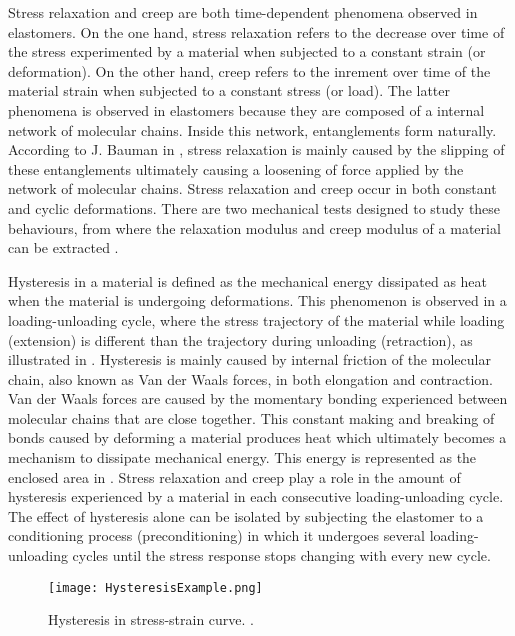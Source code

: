 Stress relaxation and creep are both time-dependent phenomena observed in elastomers. On the one hand, stress relaxation refers to the decrease over time of the stress experimented by a material when subjected to a constant strain (or deformation). On the other hand, creep refers to the inrement over time of the material strain when subjected to a constant stress (or load). The latter phenomena is observed in elastomers because they are composed of a internal network of molecular chains. Inside this network, entanglements form naturally. According to J. Bauman in \cite{Bauman2008}, stress relaxation is mainly caused by the slipping of these entanglements ultimately causing a loosening of force applied by the network of molecular chains. Stress relaxation and creep occur in both constant and cyclic deformations. There are two mechanical tests designed to study these behaviours, from where the relaxation modulus and creep modulus of a material can be extracted \cite{oberg2016}. 

Hysteresis in a material is defined as the mechanical energy dissipated as heat when the material is undergoing deformations. This phenomenon is observed in a loading-unloading cycle, where the stress trajectory of the material while loading (extension) is different than the trajectory during unloading (retraction), as illustrated in . Hysteresis is mainly caused by internal friction of the molecular chain, also known as Van der Waals forces, in both elongation and contraction. Van der Waals forces are caused by the momentary bonding experienced between molecular chains that are close together. This constant making and breaking of bonds caused by deforming a material produces heat which ultimately becomes a mechanism to dissipate mechanical energy. This energy is represented as the enclosed area in . Stress relaxation and creep play a role in the amount of hysteresis experienced by a material in each consecutive loading-unloading cycle. The effect of hysteresis alone can be isolated by subjecting the elastomer to a conditioning process (preconditioning) in which it undergoes several loading-unloading cycles until the stress response stops changing with every new cycle.

\begin{figure}[htb!]
    \centering
    \texttt{[image: HysteresisExample.png]}
    \caption{Hysteresis in stress-strain curve. \cite{Bauman2008}.}
    \label{fig:hysteresis}
\end{figure}

